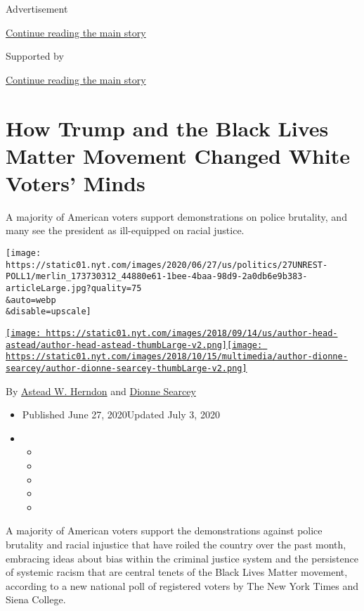Advertisement

\protect\hyperlink{after-top}{Continue reading the main story}

Supported by

\protect\hyperlink{after-sponsor}{Continue reading the main story}

\hypertarget{how-trump-and-the-black-lives-matter-movement-changed-white-voters-minds}{%
\section{How Trump and the Black Lives Matter Movement Changed White
Voters'
Minds}\label{how-trump-and-the-black-lives-matter-movement-changed-white-voters-minds}}

A majority of American voters support demonstrations on police
brutality, and many see the president as ill-equipped on racial justice.

\texttt{[image: https://static01.nyt.com/images/2020/06/27/us/politics/27UNREST-POLL1/merlin\_173730312\_44880e61-1bee-4baa-98d9-2a0db6e9b383-articleLarge.jpg?quality=75\\\&auto=webp\\\&disable=upscale]}

\href{https://www.nytimes.com/by/astead-w-herndon}{\texttt{[image: https://static01.nyt.com/images/2018/09/14/us/author-head-astead/author-head-astead-thumbLarge-v2.png]}}\href{https://www.nytimes.com/by/dionne-searcey}{\texttt{[image: https://static01.nyt.com/images/2018/10/15/multimedia/author-dionne-searcey/author-dionne-searcey-thumbLarge-v2.png]}}

By \href{https://www.nytimes.com/by/astead-w-herndon}{Astead W. Herndon}
and \href{https://www.nytimes.com/by/dionne-searcey}{Dionne Searcey}

\begin{itemize}
\item
  Published June 27, 2020Updated July 3, 2020
\item
  \begin{itemize}
  \item
  \item
  \item
  \item
  \item
  \end{itemize}
\end{itemize}

A majority of American voters support the demonstrations against police
brutality and racial injustice that have roiled the country over the
past month, embracing ideas about bias within the criminal justice
system and the persistence of systemic racism that are central tenets of
the Black Lives Matter movement, according to a new national poll of
registered voters by The New York Times and Siena College.

